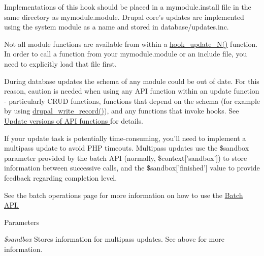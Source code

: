 Implementations of this hook should be placed in a mymodule.install file in the same directory as mymodule.module. Drupal core's updates are implemented using the system module as a name and stored in database/updates.inc.

Not all module functions are available from within a \hyperlink{group__hooks_ga908950689e6b85cd0fae3b780d69a41f}{hook\_\-update\_\-N()} function. In order to call a function from your mymodule.module or an include file, you need to explicitly load that file first.

During database updates the schema of any module could be out of date. For this reason, caution is needed when using any API function within an update function -\/ particularly CRUD functions, functions that depend on the schema (for example by using \hyperlink{group__schemaapi_ga96f707de751a962bf21b6cb0cb4f2ae6}{drupal\_\-write\_\-record()}), and any functions that invoke hooks. See \hyperlink{group__update__api}{Update versions of API functions } for details.

If your update task is potentially time-\/consuming, you'll need to implement a multipass update to avoid PHP timeouts. Multipass updates use the \$sandbox parameter provided by the batch API (normally, \$context\mbox{[}'sandbox'\mbox{]}) to store information between successive calls, and the \$sandbox\mbox{[}'finished'\mbox{]} value to provide feedback regarding completion level.

See the batch operations page for more information on how to use the \hyperlink{}{Batch API. }


\begin{DoxyParams}{Parameters}
\item[{\em \$sandbox}]Stores information for multipass updates. See above for more information.\end{DoxyParams}

